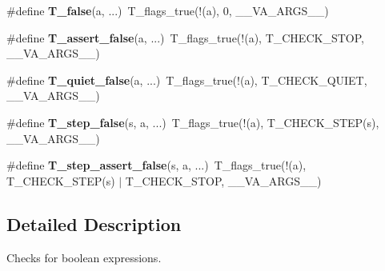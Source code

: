 \begin{DoxyCompactItemize}
\item 
\mbox{\label{group__RTEMSTestFrameworkChecksBool_ga9e82ab96782b4bc01b488ed4e19a3019}} 
\#define {\bfseries T\+\_\+false}(a, ...)~T\+\_\+flags\+\_\+true(!(a), 0, \+\_\+\+\_\+\+V\+A\+\_\+\+A\+R\+G\+S\+\_\+\+\_\+)
\item 
\mbox{\label{group__RTEMSTestFrameworkChecksBool_ga76514e16ca6ede4d4a735e8bed17714f}} 
\#define {\bfseries T\+\_\+assert\+\_\+false}(a, ...)~T\+\_\+flags\+\_\+true(!(a), T\+\_\+\+C\+H\+E\+C\+K\+\_\+\+S\+T\+OP, \+\_\+\+\_\+\+V\+A\+\_\+\+A\+R\+G\+S\+\_\+\+\_\+)
\item 
\mbox{\label{group__RTEMSTestFrameworkChecksBool_ga246fb1c249200075fb1d6b7a4d4922db}} 
\#define {\bfseries T\+\_\+quiet\+\_\+false}(a, ...)~T\+\_\+flags\+\_\+true(!(a), T\+\_\+\+C\+H\+E\+C\+K\+\_\+\+Q\+U\+I\+ET, \+\_\+\+\_\+\+V\+A\+\_\+\+A\+R\+G\+S\+\_\+\+\_\+)
\item 
\mbox{\label{group__RTEMSTestFrameworkChecksBool_ga71b699b5868d45dfe5bb3e735a70ed2f}} 
\#define {\bfseries T\+\_\+step\+\_\+false}(s,  a, ...)~T\+\_\+flags\+\_\+true(!(a), T\+\_\+\+C\+H\+E\+C\+K\+\_\+\+S\+T\+EP(s), \+\_\+\+\_\+\+V\+A\+\_\+\+A\+R\+G\+S\+\_\+\+\_\+)
\item 
\mbox{\label{group__RTEMSTestFrameworkChecksBool_gae9b4cef62f1971cb6a9b576b07fc1e43}} 
\#define {\bfseries T\+\_\+step\+\_\+assert\+\_\+false}(s,  a, ...)~T\+\_\+flags\+\_\+true(!(a), T\+\_\+\+C\+H\+E\+C\+K\+\_\+\+S\+T\+EP(s) $\vert$ T\+\_\+\+C\+H\+E\+C\+K\+\_\+\+S\+T\+OP, \+\_\+\+\_\+\+V\+A\+\_\+\+A\+R\+G\+S\+\_\+\+\_\+)
\end{DoxyCompactItemize}


\subsection{Detailed Description}
Checks for boolean expressions. 

